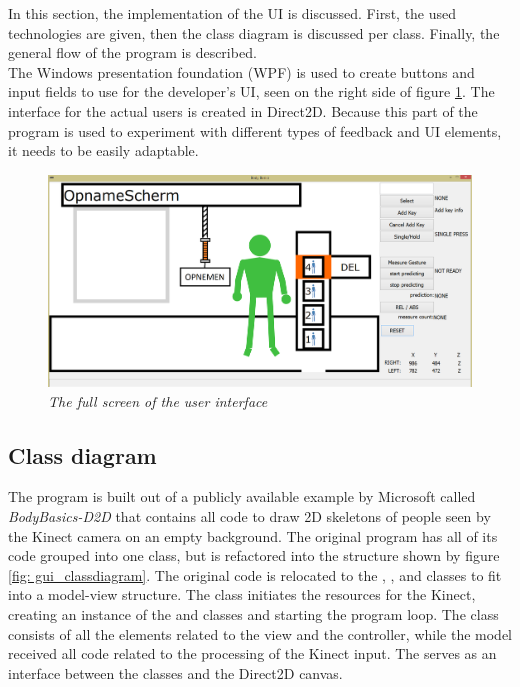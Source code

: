 In this section, the implementation of the UI is discussed. First, the used technologies are given, then the class diagram is discussed per class. Finally, the general flow of the program is described.\\

The Windows presentation foundation (WPF) is used to create buttons and input fields to use for the developer's UI, seen on the right side of figure \ref{real implementation}. The interface for the actual users is created in Direct2D. Because this part of the program is used to experiment with different types of feedback and UI elements, it needs to be easily adaptable.

\begin{figure}[H]
	\begin{center}
		\includegraphics[width=16cm]{figures/1_full_screen_with_user.png}
		\caption{\emph{The full screen of the user interface}}
		\label{real implementation}
	\end{center}
\end{figure}

\subsection{Class diagram}

The program is built out of a publicly available example by Microsoft called \emph{BodyBasics-D2D} that contains all code to draw 2D skeletons of people seen by the Kinect camera on an empty background. The original program has all of its code grouped into one class, but is refactored into the structure shown by figure \ref{fig: gui_classdiagram}. The original code is relocated to the , ,  and  classes to fit into a model-view structure. The  class initiates the resources for the Kinect, creating an instance of the  and  classes and starting the program loop. The  class consists of all the elements related to the view and the controller, while the model received all code related to the processing of the Kinect input. The  serves as an interface between the  classes and the Direct2D canvas.\\

